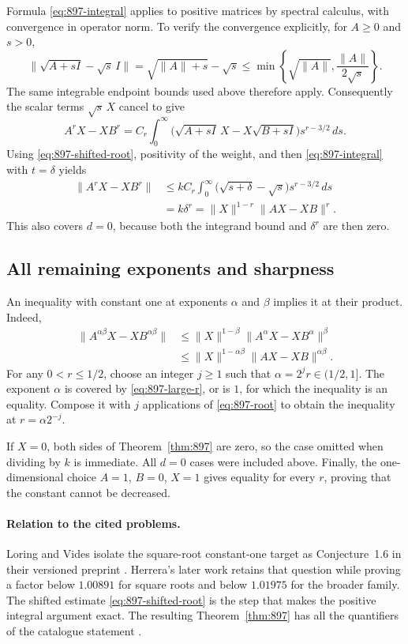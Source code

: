 \documentclass[11pt,a4paper]{article}
\theoremstyle{remark}
\begin{document}
Formula \eqref{eq:897-integral} applies to positive matrices by spectral
calculus, with convergence in operator norm. To verify the convergence
explicitly, for $A\ge0$ and $s>0$,
\[
 \|\sqrt{A+sI}-\sqrt s\,I\|
 =\sqrt{\|A\|+s}-\sqrt s
 \le\min\left\{\sqrt{\|A\|},\frac{\|A\|}{2\sqrt s}\right\}.
\]
The same integrable endpoint bounds used above therefore apply.
Consequently the scalar terms $\sqrt s\,X$ cancel to give
\[
 A^rX-XB^r
 =C_r\int_0^\infty
   \bigl(\sqrt{A+sI}\,X-X\sqrt{B+sI}\bigr)s^{r-3/2}\,ds.
\]
Using \eqref{eq:897-shifted-root}, positivity of the weight, and then
\eqref{eq:897-integral} with $t=\delta$ yields
\[
 \begin{split}
 \|A^rX-XB^r\|
 &\le kC_r\int_0^\infty
       \bigl(\sqrt{s+\delta}-\sqrt s\bigr)s^{r-3/2}\,ds\\
 &=k\delta^r
 =\|X\|^{1-r}\|AX-XB\|^r.
 \end{split}
 \tag{897.9}\label{eq:897-large-r}
\]
This also covers $d=0$, because both the integrand bound and $\delta^r$
are then zero.

\subsection{All remaining exponents and sharpness}

An inequality with constant one at exponents $\alpha$ and $\beta$ implies
it at their product. Indeed,
\[
 \begin{split}
 \|A^{\alpha\beta}X-XB^{\alpha\beta}\|
 &\le\|X\|^{1-\beta}\|A^\alpha X-XB^\alpha\|^\beta\\
 &\le\|X\|^{1-\alpha\beta}\|AX-XB\|^{\alpha\beta}.
 \end{split}
\]
For any $0<r\le1/2$, choose an integer $j\ge1$ such that
$\alpha=2^jr\in(1/2,1]$. The exponent $\alpha$ is covered by
\eqref{eq:897-large-r}, or is $1$, for which the inequality is an equality.
Compose it with $j$ applications of \eqref{eq:897-root} to obtain the
inequality at $r=\alpha2^{-j}$.

If $X=0$, both sides of Theorem~\ref{thm:897} are zero, so the case omitted
when dividing by $k$ is immediate. All $d=0$ cases were included above.
Finally, the one-dimensional choice $A=1$, $B=0$, $X=1$ gives equality for
every $r$, proving that the constant cannot be decreased.

\paragraph{Relation to the cited problems.}
Loring and Vides isolate the square-root constant-one target as
Conjecture~1.6 in their versioned preprint \cite{LoringVides2013}.
Herrera's later work \cite{Herrera2023} retains that question while proving
a factor below $1.00891$ for square roots and below $1.01975$ for the
broader family. The shifted estimate \eqref{eq:897-shifted-root} is the
step that makes the positive integral argument exact. The resulting
Theorem~\ref{thm:897} has all the quantifiers of the catalogue statement
\cite{AIM}.
\end{document}
